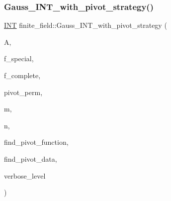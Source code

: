 \subsubsection{\texorpdfstring{Gauss\+\_\+\+I\+N\+T\+\_\+with\+\_\+pivot\+\_\+strategy()}{Gauss\_INT\_with\_pivot\_strategy()}}
{\footnotesize\ttfamily \mbox{\hyperlink{galois_8h_a09fddde158a3a20bd2dcadb609de11dc}{I\+NT}} finite\+\_\+field\+::\+Gauss\+\_\+\+I\+N\+T\+\_\+with\+\_\+pivot\+\_\+strategy (\begin{DoxyParamCaption}\item[{\mbox{\hyperlink{galois_8h_a09fddde158a3a20bd2dcadb609de11dc}{I\+NT}} $\ast$}]{A,  }\item[{\mbox{\hyperlink{galois_8h_a09fddde158a3a20bd2dcadb609de11dc}{I\+NT}}}]{f\+\_\+special,  }\item[{\mbox{\hyperlink{galois_8h_a09fddde158a3a20bd2dcadb609de11dc}{I\+NT}}}]{f\+\_\+complete,  }\item[{\mbox{\hyperlink{galois_8h_a09fddde158a3a20bd2dcadb609de11dc}{I\+NT}} $\ast$}]{pivot\+\_\+perm,  }\item[{\mbox{\hyperlink{galois_8h_a09fddde158a3a20bd2dcadb609de11dc}{I\+NT}}}]{m,  }\item[{\mbox{\hyperlink{galois_8h_a09fddde158a3a20bd2dcadb609de11dc}{I\+NT}}}]{n,  }\item[{\mbox{\hyperlink{galois_8h_a09fddde158a3a20bd2dcadb609de11dc}{I\+NT}}($\ast$)(\mbox{\hyperlink{galois_8h_a09fddde158a3a20bd2dcadb609de11dc}{I\+NT}} $\ast$\mbox{\hyperlink{simeon_8_c_a97833f04c3a9c008df5521a2fc291bb4}{A}}, \mbox{\hyperlink{galois_8h_a09fddde158a3a20bd2dcadb609de11dc}{I\+NT}} m, \mbox{\hyperlink{galois_8h_a09fddde158a3a20bd2dcadb609de11dc}{I\+NT}} \mbox{\hyperlink{simeon_8_c_a7f2cd26777ce0ff3fdaf8d02aacbddfb}{n}}, \mbox{\hyperlink{galois_8h_a09fddde158a3a20bd2dcadb609de11dc}{I\+NT}} \mbox{\hyperlink{alphabet2_8_c_acab531abaa74a7e664e3986f2522b33a}{r}}, \mbox{\hyperlink{galois_8h_a09fddde158a3a20bd2dcadb609de11dc}{I\+NT}} $\ast$pivot\+\_\+perm, void $\ast$data)}]{find\+\_\+pivot\+\_\+function,  }\item[{void $\ast$}]{find\+\_\+pivot\+\_\+data,  }\item[{\mbox{\hyperlink{galois_8h_a09fddde158a3a20bd2dcadb609de11dc}{I\+NT}}}]{verbose\+\_\+level }\end{DoxyParamCaption})}

\mbox{\label{classfinite__field_aba4950590e24a1ce323f292cf47b3307}} 
